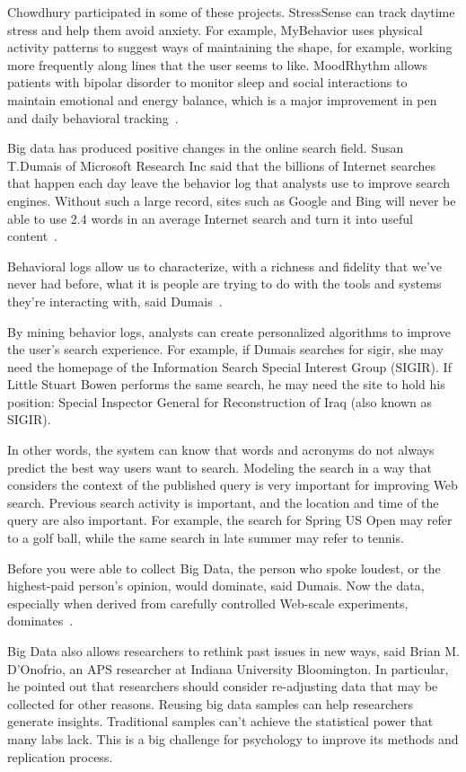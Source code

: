 Chowdhury participated in some of these projects. StressSense can track 
daytime stress and help them avoid anxiety. For example, MyBehavior uses 
physical activity patterns to suggest ways of maintaining the shape, for 
example, working more frequently along lines that the user seems to like. 
MoodRhythm allows patients with bipolar disorder to monitor sleep and social 
interactions to maintain emotional and energy balance, which is a major 
improvement in pen and daily behavioral tracking~\cite{editor00}. 

Big data has produced positive changes in the online search field. 
Susan T.Dumais of Microsoft Research Inc said that the billions of 
Internet searches that happen each day leave the behavior log that 
analysts use to improve search engines. Without such a large record, 
sites such as Google and Bing will never be able to use 2.4 words in 
an average Internet search and turn it into useful 
content~\cite{editor00}.

Behavioral logs allow us to characterize, with a richness and fidelity 
that we’ve never had before, what it is people are trying to do with
the tools and systems they’re interacting with, said Dumais~\cite{editor00}.

By mining behavior logs, analysts can create personalized algorithms 
to improve the user's search experience. For example, if Dumais searches 
for sigir, she may need the homepage of the Information Search Special 
Interest Group (SIGIR). If Little Stuart Bowen performs the same search, 
he may need the site to hold his position: Special Inspector General 
for Reconstruction of Iraq (also known as SIGIR).

In other words, the system can know that words and acronyms do not always 
predict the best way users want to search. Modeling the search in a way 
that considers the context of the published query is very important for 
improving Web search. Previous search activity is important, and the 
location and time of the query are also important. For example, the 
search for Spring US Open may refer to a golf ball, while the same 
search in late summer may refer to tennis.

Before you were able to collect Big Data, the person who spoke loudest, 
or the highest-paid person’s opinion, would dominate, said Dumais. Now 
the data, especially when derived from carefully controlled Web-scale 
experiments, dominates~\cite{editor00}.

Big Data also allows researchers to rethink past issues in new ways, 
said Brian M. D'Onofrio, an APS researcher at Indiana University Bloomington. 
In particular, he pointed out that researchers should consider re-adjusting 
data that may be collected for other reasons. Reusing big data samples can 
help researchers generate insights. Traditional samples can't achieve the 
statistical power that many labs lack. This is a big challenge for psychology 
to improve its methods and replication process.


